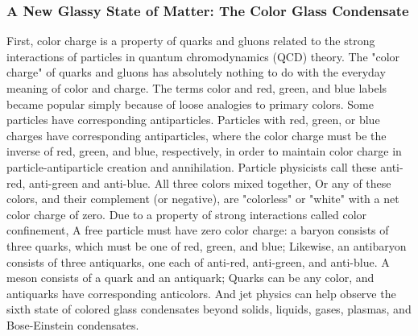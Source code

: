 \documentclass[12pt, a4paper, oneside]{article}
\begin{document}
\begin{spacing}{2.0}
\subsubsection{A New Glassy State of Matter: The Color Glass Condensate}
First, color charge is a property of quarks and gluons related to the strong interactions of particles in quantum chromodynamics (QCD) theory.
The "color charge" of quarks and gluons has absolutely nothing to do with the everyday meaning of color and charge. The terms color and red, green, and blue labels became popular simply because of loose analogies to primary colors.
Some particles have corresponding antiparticles. Particles with red, green, or blue charges have corresponding antiparticles, where the color charge must be the inverse of red, green, and blue, respectively,
in order to maintain color charge in particle-antiparticle creation and annihilation. Particle physicists call these anti-red, anti-green and anti-blue. All three colors mixed together,
Or any of these colors, and their complement (or negative), are "colorless" or "white" with a net color charge of zero. Due to a property of strong interactions called color confinement,
A free particle must have zero color charge: a baryon consists of three quarks, which must be one of red, green, and blue;
Likewise, an antibaryon consists of three antiquarks, one each of anti-red, anti-green, and anti-blue. A meson consists of a quark and an antiquark;
Quarks can be any color, and antiquarks have corresponding anticolors.
And jet physics can help observe the sixth state of colored glass condensates beyond solids, liquids, gases, plasmas, and Bose-Einstein condensates. \cite{https://doi.org/10.1111/ijag.12013}

\end{spacing}
\end{document}
